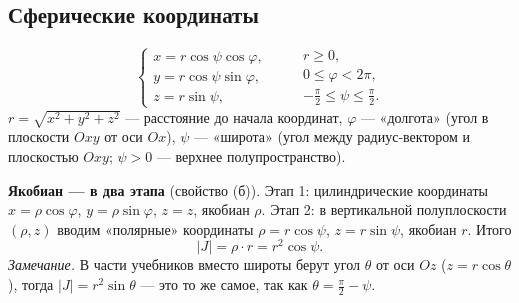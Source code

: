 \subsection{Сферические координаты}
\begin{minipage}{0.56\linewidth}
\[
\begin{cases}x=r\cos\psi\cos\varphi,\\ y=r\cos\psi\sin\varphi,\\ z=r\sin\psi,\end{cases}\qquad
\begin{array}{l} r\geqslant0,\\ 0\leqslant\varphi<2\pi,\\ -\frac\pi2\leqslant\psi\leqslant\frac\pi2.\end{array}
\]
$r=\sqrt{x^2+y^2+z^2}$ --- расстояние до начала координат, $\varphi$ --- «долгота» (угол в плоскости $Oxy$ от оси $Ox$), $\psi$ --- «широта» (угол между радиус-вектором и плоскостью $Oxy$; $\psi>0$ --- верхнее полупространство).
\end{minipage}\hfill
\begin{minipage}{0.4\linewidth}\centering
{}
\end{minipage}

\textbf{Якобиан --- в два этапа} (свойство (б)). Этап 1: цилиндрические координаты $x=\rho\cos\varphi$, $y=\rho\sin\varphi$, $z=z$, якобиан $\rho$. Этап 2: в вертикальной полуплоскости $(\rho,z)$ вводим «полярные» координаты $\rho=r\cos\psi$, $z=r\sin\psi$, якобиан $r$. Итого
\[
\boxed{\ |J|=\rho\cdot r=r^2\cos\psi .\ }
\]
\emph{Замечание.} В части учебников вместо широты берут угол $\theta$ от оси $Oz$ ($z=r\cos\theta$), тогда $|J|=r^2\sin\theta$ --- это то же самое, так как $\theta=\frac\pi2-\psi$.

